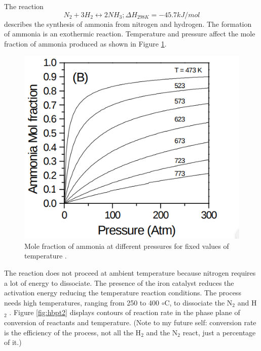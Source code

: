 \documentclass[11pt,letterpaper]{article}
\begin{document}
The reaction 
\begin{equation}
N_2 + 3 H_2 \leftrightarrow 2 NH_3; \Delta H_{298K}=-45.7kJ/mol
\end{equation}
describes the synthesis of ammonia from nitrogen and hydrogen. The formation of ammonia is an exothermic reaction. Temperature and pressure affect the mole fraction of ammonia produced as shown in Figure \ref{fig:hbpt}.

\begin{figure}[] %
	\centering
	\includegraphics[width=\linewidth]{figures/haberbosch.png}
	\hfill
	\caption{Mole fraction of ammonia at different pressures for fixed values of temperature \cite{modak_haber_2011}.}
	\label{fig:hbpt}
\end{figure}

The reaction does not proceed at ambient temperature because nitrogen requires a lot of energy to dissociate. The presence of the iron catalyst reduces the activation energy reducing the temperature reaction conditions. The process needs high temperatures, ranging from 250 to 400 ${\circ}$C, to dissociate the N$_2$ and H$_2$ \cite{modak_haber_2011}. Figure \ref{fig:hbpt2} displays contours of reaction rate in the phase plane of conversion of reactants and temperature. (Note to my future self: conversion rate is the efficiency of the process, not all the H$_2$ and the N$_2$ react, just a percentage of it.)
\end{document}
